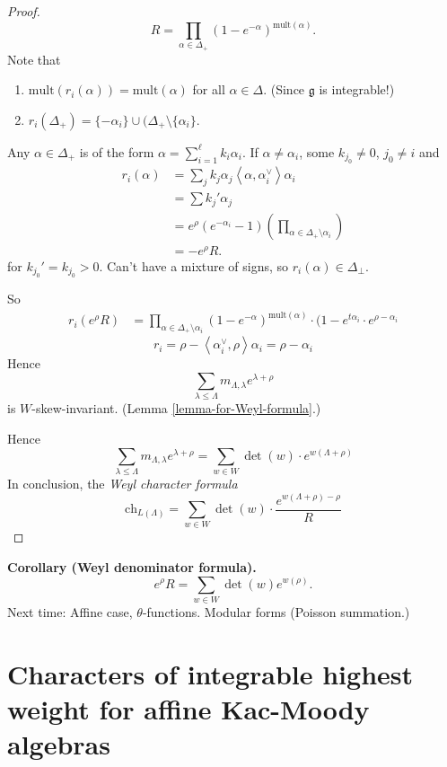 \begin{proof}
$$
R=\prod_{\alpha \in \Delta_+}(1-e^{-\alpha})^{\text{mult}(\alpha)}.
$$
Note that
\begin{enumerate}
\item $\text{mult}(r_i(\alpha))=\text{mult}(\alpha)$ 
for all $\alpha \in \Delta$. (Since $\mathfrak{g}$ is integrable!)
\item $r_i(\Delta_+)=\{-\alpha_i\}\cup (\Delta_+\setminus\{\alpha_i\}$.
\end{enumerate}
Any $\alpha \in \Delta_+$ is of the form
$\alpha = \sum_{i=1}^\ell k_i \alpha_i$.
If $\alpha \neq \alpha_i$, some $k_{j_0}\neq 0$, $j_0 \neq  i$ and
\begin{align*}
r_i(\alpha)&=\sum_{j}k_j \alpha_j
\left<\alpha,\alpha_i^\vee\right>\alpha_i\\
&=\sum k_j' \alpha_j\\
&=e^\rho(e^{-\alpha_i}-1)
\left(\prod_{\alpha \in \Delta_+ \setminus \alpha_i}\right)\\
&=-e^\rho R.
\end{align*}
for $k_{j_0}'=k_{j_0}>0$. Can't have a mixture of signs,
so $r_i(\alpha) \in \Delta_{\perp}$.

So
\begin{align*}
r_i(e^\rho R)&=\prod_{\alpha \in \Delta_+\setminus \alpha_i}
(1-e^{-\alpha})^{\text{mult}(\alpha)}
\cdot (1-e^{t \alpha_i}\cdot e^{\rho-\alpha_i}
\end{align*}
$$
r_i=\rho-\left<\alpha_i^\vee,\rho\right>\alpha_i=\rho-\alpha_i
$$
Hence
$$
\sum_{\lambda \leq  \Lambda}m_{\Lambda,\lambda}e^{\lambda+\rho}
$$
is $W$-skew-invariant. (Lemma \ref{lemma-for-Weyl-formula}.)

Hence
$$
\sum_{\lambda \leq  \Lambda}m_{\Lambda,\lambda}e^{\lambda+\rho}
=\sum_{w \in W}\det(w)\cdot e^{w(\Lambda+\rho)}
$$
In conclusion, the {\it Weyl character formula} 
$$
\text{ch}_{L(\Lambda)}=\sum_{w \in W}\det(w)
\cdot \frac{e^{w(\Lambda+\rho)-\rho}}{R}
$$
\end{proof}

\medskip\noindent
{\bf Corollary (Weyl denominator formula).}
$$
e^{\rho}R=\sum_{w \in W}\det(w)e^{w(\rho)}.
$$
Next time: Affine case, $\theta$-functions. Modular forms (Poisson summation.)

\section{Characters of integrable highest weight for affine Kac-Moody algebras}
\label{section-characters-of-integrable-highest-weight-
for-affine-Kac-Moody-algebras}

